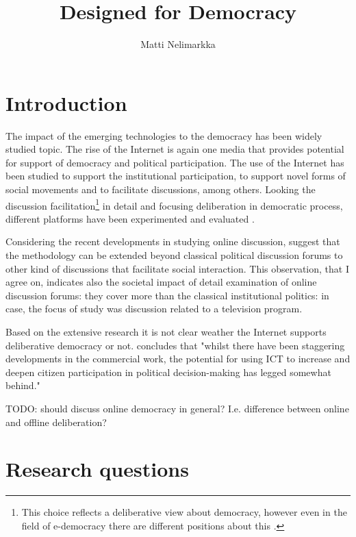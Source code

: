 \documentclass[journal,a4paper]{IEEEtran}
\author{Matti Nelimarkka}
\title{Designed for Democracy}
\begin{document}
\maketitle

\setlength{\parindent}{0pt}
\setlength{\parskip}{1ex}


\section{Introduction}

The impact of the emerging technologies to the democracy has been widely studied topic. The rise of the Internet is again one media that provides potential for support of democracy and political participation. The use of the Internet has been studied to support the institutional participation, to support novel forms of social movements and to facilitate discussions, among others. Looking the discussion facilitation\footnote{This choice reflects a deliberative view about democracy, however even in the field of e-democracy there are different positions about this .} in detail and focusing deliberation in democratic process, different platforms have been experimented  and evaluated .

Considering the recent developments in studying online discussion,  suggest that the methodology can be extended beyond classical political discussion forums to other kind of discussions that facilitate social interaction. This observation, that I agree on, indicates also the societal impact of detail examination of online discussion forums: they cover more than the classical institutional politics: in  case, the focus of study was discussion related to a television program.

Based on the extensive research it is not clear weather the Internet supports deliberative democracy or not.  concludes that "whilst there have been staggering developments in the commercial work, the potential for using ICT to increase and deepen citizen participation in political decision-making has legged somewhat behind."

TODO: should discuss online democracy in general? I.e. difference between online and offline deliberation?

\section{Research questions}
\end{document}
